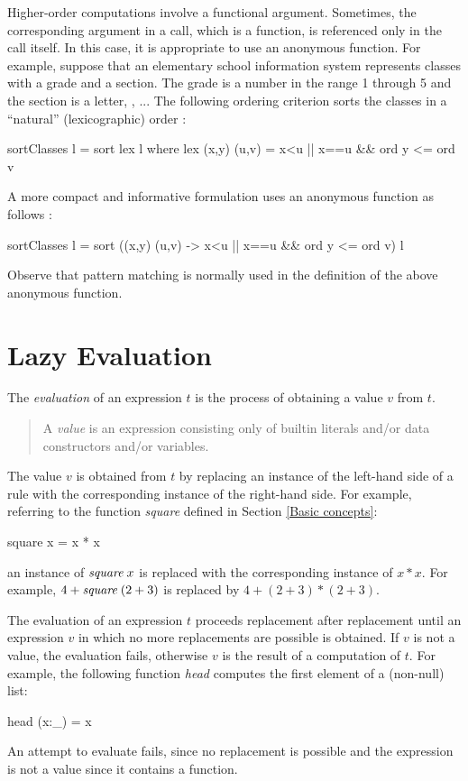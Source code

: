 Higher-order computations involve a functional argument.
Sometimes, the corresponding argument in a call, which is
a function, is referenced only in the call itself.
In this case, it is appropriate to use an anonymous
function.
For example, suppose that an elementary school information
system represents classes with a grade and a section.
The grade is a number in the range 1 through 5 and the
section is a letter, ,  ...
The following ordering criterion sorts the classes
in a  ``natural'' (lexicographic) order
:
%
\begin{prog}
sortClasses l = sort lex l
   where lex (x,y) (u,v) = x<u || x==u \&\& ord y <= ord v 
\end{prog}
%
A more compact and informative formulation uses
an anonymous function as follows
:
%
\begin{prog}
sortClasses l = sort ((x,y) (u,v) -> x<u || x==u \&\& ord y <= ord v) l
\end{prog}
%
Observe that pattern matching is normally used in the definition
of the above anonymous function.


\section{Lazy Evaluation}
\label{sec-lazy-evaluation}

The \emph{evaluation}
of an expression $t$ is the process of
obtaining a value $v$ from $t$.
%
\begin{quote}
A \emph{value} is an expression consisting
only of builtin literals and/or data constructors and/or variables.
\end{quote}
%
The value $v$ is obtained from $t$ by replacing an instance of
the left-hand side of a rule with the corresponding
instance of the right-hand side.
For example, referring to the function \emph{square} defined
in Section \ref{Basic concepts}:
%
\begin{prog}
square x = x * x
\end{prog}
%
an instance of $\emph{square}\;x$
is replaced with the corresponding instance of $x * x$.
For example, $4+\emph{square}\;(2+3)$ is replaced by $4+(2+3)*(2+3)$.

The evaluation of an expression $t$ 
proceeds replacement after replacement until an expression $v$
in which no more replacements are possible is obtained.
If $v$ is not a value, the evaluation fails,
otherwise $v$ is the result of a computation of $t$.
For example, the following function \emph{head}
computes the first element of a (non-null) list:
%
\begin{prog}
head (x:_) = x
\end{prog}
%
An attempt to evaluate  fails, since
no replacement is possible and the expression is not a value
since it contains a function.

